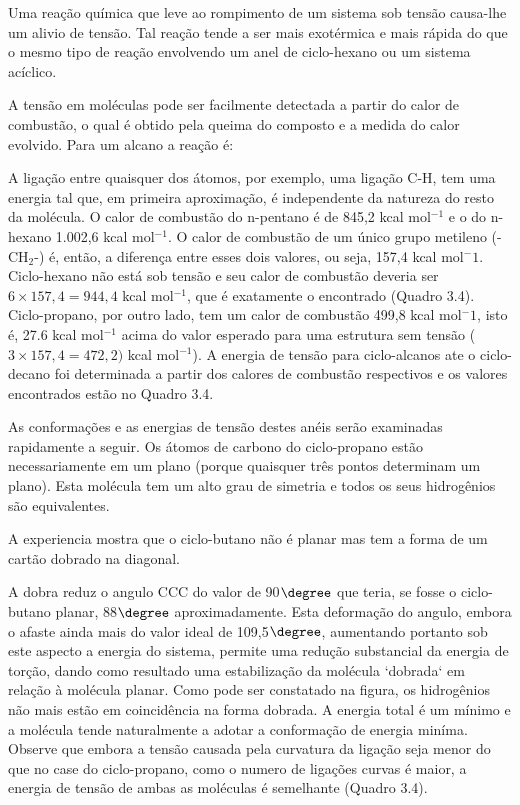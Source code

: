 Uma reação química que leve ao rompimento de um sistema sob tensão causa-lhe um alivio de tensão. Tal reação tende a ser mais exotérmica e mais rápida do que o mesmo tipo de reação envolvendo um anel de ciclo-hexano ou um sistema acíclico. 

A tensão em moléculas pode ser facilmente detectada a partir do calor de combustão, o qual é obtido pela queima do composto e a medida do calor evolvido. Para um alcano a reação é:

\begin{figure}[H]
    \centering
\end{figure}

A ligação entre quaisquer dos átomos, por exemplo, uma ligação C-H, tem uma energia tal que, em primeira aproximação, é independente da natureza do resto da molécula. O calor de combustão do n-pentano é de 845,2 kcal mol$^{-1}$ e o do n-hexano 1.002,6 kcal mol$^{-1}$. O calor de combustão de um único grupo metileno (-CH$_{2}$-) é, então, a diferença entre esses dois valores, ou seja, 157,4 kcal mol${^-1}$. Ciclo-hexano não está sob tensão e seu calor de combustão deveria ser $6\times157,4 = 944,4$ kcal mol$^{-1}$, que é exatamente o encontrado (Quadro 3.4). Ciclo-propano, por outro lado, tem um calor de combustão 499,8 kcal mol${^-1}$, isto é, 27.6 kcal mol$^{-1}$ acima do valor esperado para uma estrutura sem tensão ($3\times157,4=472,2)$ kcal mol$^{-1}$). A energia de tensão para ciclo-alcanos ate o ciclo-decano foi determinada a partir dos calores de combustão respectivos e os valores encontrados estão no Quadro 3.4.

As conformações e as energias de tensão destes anéis serão examinadas rapidamente a seguir. Os átomos de carbono do ciclo-propano estão necessariamente em um plano (porque quaisquer três pontos determinam um plano). Esta molécula tem um alto grau de simetria e todos os seus hidrogênios são equivalentes.

A experiencia mostra que o ciclo-butano não é planar mas tem a forma de um cartão dobrado na diagonal.

\begin{figure}[H]
    \centering
\end{figure}

A dobra reduz o angulo CCC do valor de 90$\degree$ que teria, se fosse o ciclo-butano planar, 88$\degree$ aproximadamente. Esta deformação do angulo, embora o afaste ainda mais do valor ideal de 109,5$\degree$, aumentando portanto sob este aspecto a energia do sistema, permite uma redução substancial da energia de torção, dando como resultado uma estabilização da molécula `dobrada` em relação à molécula planar. Como pode ser constatado na figura, os hidrogênios não mais estão em coincidência na forma dobrada. A energia total é um mínimo e a molécula tende naturalmente a adotar a conformação de energia miníma. Observe que embora a tensão causada pela curvatura da ligação seja menor do que no case do ciclo-propano, como o numero de ligações curvas é maior, a energia de tensão de ambas as moléculas é semelhante (Quadro 3.4).


